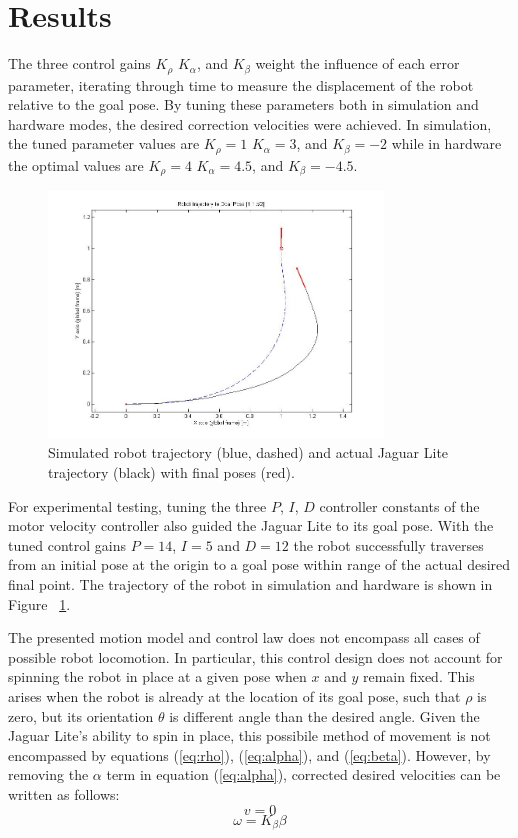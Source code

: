 \documentclass[conference]{IEEEtran}
\begin{document}
\section{Results}

The three control gains $K_{\rho}$ $K_{\alpha}$, and $K_{\beta}$ weight the influence 
of each error parameter, iterating through time to measure the displacement of the robot
relative to the goal pose. By tuning these parameters both in simulation and hardware modes, 
the desired correction velocities were achieved. In simulation, the tuned parameter values are 
$K_{\rho} = 1$ $K_{\alpha} =  3$, and $K_{\beta} = -2$ while in hardware the optimal values 
are $K_{\rho} = 4$ $K_{\alpha} =  4.5$, and $K_{\beta} = -4.5$.

\begin{figure}[t]
\centering
\includegraphics[width = 3.5in]{trajectory.jpg}
\caption{Simulated robot trajectory (blue, dashed) and actual Jaguar Lite trajectory (black) with final poses (red).}
\label{fig4}
\end{figure}

For experimental testing, tuning the three $P$, $I$, $D$
controller constants of the motor velocity controller also guided the Jaguar Lite to its goal pose. 
With the tuned control gains $P = 14$, $I = 5$ and $D = 12$ the robot successfully traverses from an initial pose at the origin to a goal pose within range of the 
actual desired final point. The trajectory of the robot in simulation and hardware is shown in Figure ~\ref{fig4}.

The presented motion model and control law does not encompass all cases of possible robot 
locomotion. In particular, this control design does not account for spinning the robot in place at a 
given pose when $x$ and $y$ remain fixed.  This arises when the robot is already at the location 
of its goal pose, such that $\rho$ is zero, but its orientation $\theta$ is different angle than the desired angle.  Given the 
Jaguar Lite's ability to spin in place, this possibile method of movement is not encompassed by equations
 (\ref{eq:rho}), (\ref{eq:alpha}), and (\ref{eq:beta}).  
However, by removing the $\alpha$ term in equation (\ref{eq:alpha}), corrected desired velocities 
can be written as follows:
\begin{equation} 
v = 0
\end{equation}
\begin{equation}
\omega = K_{\beta} \beta 
\end{equation}
\end{document}
